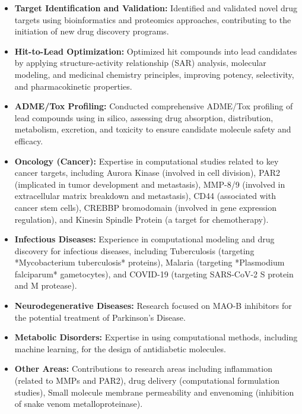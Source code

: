 \documentclass[10pt,a4paper,ragged2e,withhyper]{altacv}
\begin{document}
\hspace*{-1em}
\begin{itemize}
    \item \textbf{Target Identification and Validation:} Identified and validated novel drug targets using bioinformatics and proteomics approaches, contributing to the initiation of new drug discovery programs.
    \item \textbf{Hit-to-Lead Optimization:} Optimized hit compounds into lead candidates by applying structure-activity relationship (SAR) analysis, molecular modeling, and medicinal chemistry principles, improving potency, selectivity, and pharmacokinetic properties.
    \item \textbf{ADME/Tox Profiling:} Conducted comprehensive ADME/Tox profiling of lead compounds using in silico, assessing drug absorption, distribution, metabolism, excretion, and toxicity to ensure candidate molecule safety and efficacy.
\end{itemize}

\begin{itemize}
    \item \textbf{Oncology (Cancer):} Expertise in computational studies related to key cancer targets, including Aurora Kinase (involved in cell division), PAR2 (implicated in tumor development and metastasis), MMP-8/9 (involved in extracellular matrix breakdown and metastasis), CD44 (associated with cancer stem cells), CREBBP bromodomain (involved in gene expression regulation), and Kinesin Spindle Protein (a target for chemotherapy).
    \item \textbf{Infectious Diseases:} Experience in computational modeling and drug discovery for infectious diseases, including Tuberculosis (targeting *Mycobacterium tuberculosis* proteins), Malaria (targeting *Plasmodium falciparum* gametocytes), and COVID-19 (targeting SARS-CoV-2 S protein and M protease).
    \item \textbf{Neurodegenerative Diseases:} Research focused on MAO-B inhibitors for the potential treatment of Parkinson's Disease.
    \item \textbf{Metabolic Disorders:} Expertise in using computational methods, including machine learning, for the design of antidiabetic molecules.
    \item \textbf{Other Areas:} Contributions to research areas including inflammation (related to MMPs and PAR2), drug delivery (computational formulation studies), Small molecule membrane permeability and envenoming (inhibition of snake venom metalloproteinase).
\end{itemize}
\end{document}
